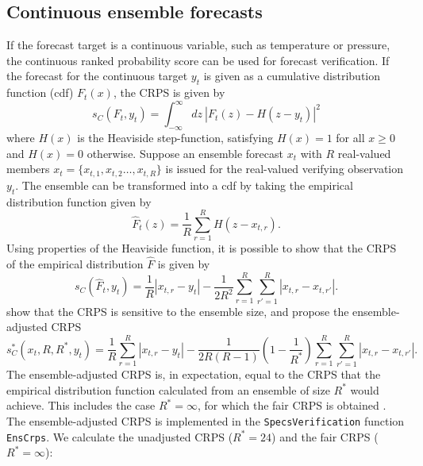 \documentclass[10pt]{article}\usepackage[]{graphicx}\usepackage[]{color}
\newcommand{\pkg}[1]{\texttt{#1}}
\newcommand{\code}[1]{\texttt{#1}}
\begin{document}
\subsection{Continuous ensemble forecasts}


If the forecast target is a continuous variable, such as temperature or pressure, the continuous ranked probability score \citep[CRPS;][]{matheson1976scoring} can be used for forecast verification.
If the forecast for the continuous target $y_t$ is given as a cumulative distribution function (cdf) $F_t(x)$, the CRPS is given by 
%
\begin{equation}
s_{C}(F_t, y_t) = \int_{-\infty}^\infty dz\ \left|F_t(z) - H(z-y_t)\right|^2
\label{eq:crps}
\end{equation}
%
where $H(x)$ is the Heaviside step-function, satisfying $H(x)=1$ for all $x\ge 0$ and $H(x)=0$ otherwise.
Suppose an ensemble forecast $x_t$ with $R$ real-valued members $x_t = \{x_{t,1}, x_{t,2} \dots, x_{t,R}\}$ is issued for the real-valued verifying observation $y_t$.
The ensemble can be transformed into a cdf by taking the empirical distribution function given by 
%
\begin{equation}
\hat{F}_t(z) = \frac{1}{R} \sum_{r=1}^{R} H(z - x_{t,r}).
\end{equation}
%
Using properties of the Heaviside function, it is possible to show that the CRPS of the empirical distribution $\hat{F}$ is given by
%
\begin{equation}
s_{C}(\hat{F}_t, y_t) = \frac{1}{R}|x_{t,r}-y_t| - \frac{1}{2R^2} \sum_{r=1}^R \sum_{r'=1}^R |x_{t,r}-x_{t,r'}|.
\end{equation}
%
\citet{fricker2013three} show that the CRPS is sensitive to the ensemble size, and propose the ensemble-adjusted CRPS
%
\begin{equation}
s_{C}^*(x_t, R, R^*, y_t) = \frac{1}{R}\sum_{r=1}^R |x_{t,r} - y_t| - \frac{1}{2R(R-1)}\left(1-\frac{1}{R^*}\right) \sum_{r=1}^R\sum_{r'=1}^R |x_{t,r}-x_{t,r'}|.
\end{equation}
%
The ensemble-adjusted CRPS is, in expectation, equal to the CRPS that the empirical distribution function calculated from an ensemble of size $R^*$ would achieve.
This includes the case $R^*=\infty$, for which the fair CRPS is obtained \citep{fricker2013three}.
The ensemble-adjusted CRPS is implemented in the \pkg{SpecsVerification} function \code{EnsCrps}.
We calculate the unadjusted CRPS ($R^*=24$) and the fair CRPS ($R^*=\infty$):
%
\end{document}

